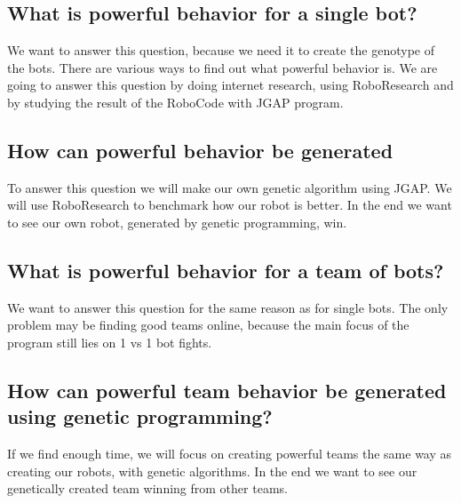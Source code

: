 
\subsection{What is powerful behavior for a single bot?}
We want to answer this question, because we need it to create the genotype of the bots. There are various ways to find out what powerful behavior is. We are going to answer this question by doing internet research, using RoboResearch and by studying the result of the RoboCode with JGAP program.

\subsection{How can powerful behavior be generated}
To answer this question we will make our own genetic algorithm using JGAP. We will use RoboResearch to benchmark how our robot is better. In the end we want to see our own robot, generated by genetic programming, win.

\subsection{What is powerful behavior for a team of bots?}
We want to answer this question for the same reason as for single bots. The only problem may be finding good teams online, because the main focus of the program still lies on 1 vs 1 bot fights.

\subsection{How can powerful team behavior be generated using genetic programming?}
If we find enough time, we will focus on creating powerful teams the same way as creating our robots, with genetic algorithms. In the end we want to see our genetically created team winning from other teams.
